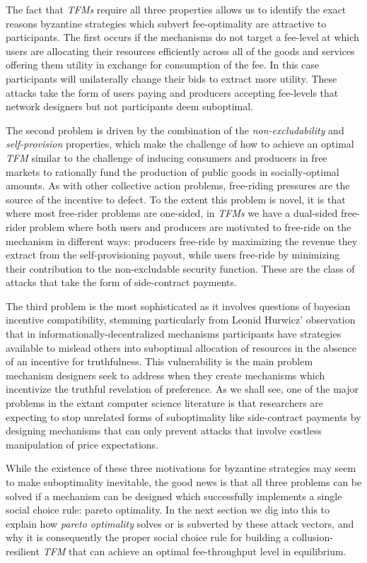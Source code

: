 \documentclass[sigconf,anonymous]{aamas}
\begin{document}
The fact that \textit{TFMs} require all three properties allows us to identify the exact reasons byzantine strategies which subvert fee-optimality are attractive to participants. The first occurs if the mechanisms do not target a fee-level at which users are allocating their resources efficiently across all of the goods and services offering them utility in exchange for consumption of the fee. In this case participants will unilaterally change their bids to extract more utility. These attacks take the form of users paying and producers accepting fee-levels that network designers but not participants deem suboptimal.

The second problem is driven by the combination of the \textit{non-excludability} and \textit{self-provision} properties, which make the challenge of how to achieve an optimal \textit{TFM} similar to the challenge of inducing consumers and producers in free markets to rationally fund the production of public goods in socially-optimal amounts. As with other collective action problems, free-riding pressures are the source of the incentive to defect. To the extent this problem is novel, it is that where most free-rider problems are one-sided, in \textit{TFMs} we have a dual-sided free-rider problem where both users and producers are motivated to free-ride on the mechanism in different ways: producers free-ride by maximizing the revenue they extract from the self-provisioning payout, while users free-ride by minimizing their contribution to the non-excludable security function. These are the class of attacks that take the form of side-contract payments.

The third problem is the most sophisticated as it involves questions of bayesian incentive compatibility, stemming particularly from Leonid Hurwicz' observation that in informationally-decentralized mechanisms participants have strategies available to mislead others into suboptimal allocation of resources in the absence of an incentive for truthfulness. This vulnerability is the main problem mechanism designers seek to address when they create mechanisms which incentivize the truthful revelation of preference. As we shall see, one of the major problems in the extant computer science literature is that researchers are expecting to stop unrelated forms of suboptimality like side-contract payments by designing mechanisms that can only prevent attacks that involve costless manipulation of price expectations.

While the existence of these three motivations for byzantine strategies may seem to make suboptimality inevitable, the good news is that all three problems can be solved if a mechanism can be designed which successfully implements a single social choice rule: pareto optimality. In the next section we dig into this to explain how \textit{pareto optimality} solves or is subverted by these attack vectors, and why it is consequently the proper social choice rule for building a collusion-resilient \textit{TFM} that can achieve an optimal fee-throughput level in equilibrium.
\end{document}
